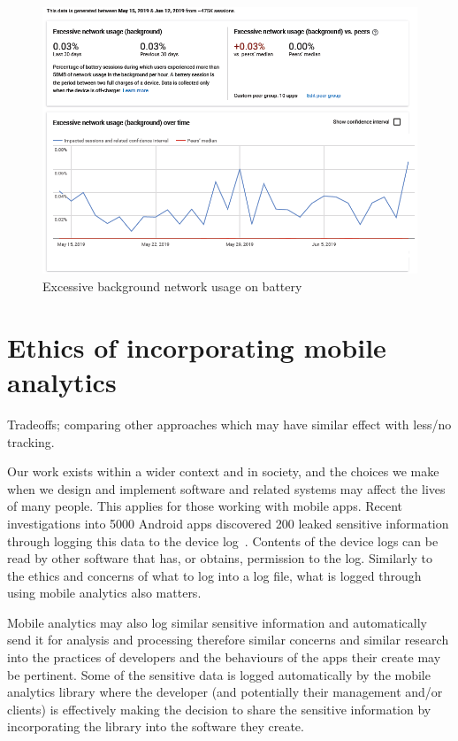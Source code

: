 
\begin{figure}[!htbp]
    \centering
    \includegraphics[width=\textwidth, keepaspectratio]{images/android-vitals-screenshots/Excessive_network_usage_by_kiwix_15_jun_2019.png}
    \caption{Excessive background network usage on battery}
    \label{fig:android_vitals_excessive_network_usage}
\end{figure}

\section{Ethics of incorporating mobile analytics}
Tradeoffs; comparing other approaches which may have similar effect with less/no tracking.

Our work exists within a wider context and in society, and the choices we make when we design and implement software and related systems may affect the lives of many people. This applies for those working with mobile apps. Recent investigations into 5000 Android apps discovered 200 leaked sensitive information through logging this data to the device log~\citep{zhou2020_mobilogleak}. Contents of the device logs can be read by other software that has, or obtains, permission to the log. 
%
Similarly to the ethics and concerns of what to log into a log file, what is logged through using mobile analytics also matters.

Mobile analytics may also log similar sensitive information and automatically send it for analysis and processing therefore similar concerns and similar research into the practices of developers and the behaviours of the apps their create may be pertinent. Some of the sensitive data is logged automatically by the mobile analytics library where the developer (and potentially their management and/or clients) is effectively making the decision to share the sensitive information by incorporating the library into the software they create.

